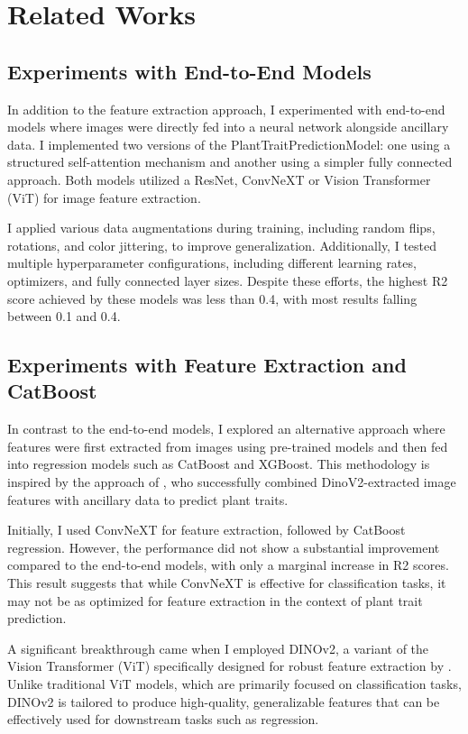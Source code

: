\documentclass{article}
\begin{document}
\section{Related Works}

\subsection{Experiments with End-to-End Models}
In addition to the feature extraction approach, I experimented with end-to-end models where images were directly fed into a neural network alongside ancillary data. I implemented two versions of the PlantTraitPredictionModel: one using a structured self-attention mechanism and another using a simpler fully connected approach. Both models utilized a ResNet, ConvNeXT or Vision Transformer (ViT) for image feature extraction.

I applied various data augmentations during training, including random flips, rotations, and color jittering, to improve generalization. Additionally, I tested multiple hyperparameter configurations, including different learning rates, optimizers, and fully connected layer sizes. Despite these efforts, the highest R2 score achieved by these models was less than 0.4, with most results falling between 0.1 and 0.4.

\subsection{Experiments with Feature Extraction and CatBoost}
In contrast to the end-to-end models, I explored an alternative approach where features were first extracted from images using pre-trained models and then fed into regression models such as CatBoost and XGBoost. This methodology is inspired by the approach of \citet{korotas2024}, who successfully combined DinoV2-extracted image features with ancillary data to predict plant traits.

Initially, I used ConvNeXT for feature extraction, followed by CatBoost regression. However, the performance did not show a substantial improvement compared to the end-to-end models, with only a marginal increase in R2 scores. This result suggests that while ConvNeXT is effective for classification tasks, it may not be as optimized for feature extraction in the context of plant trait prediction.

A significant breakthrough came when I employed DINOv2, a variant of the Vision Transformer (ViT) specifically designed for robust feature extraction by \citet{DINOv2}. Unlike traditional ViT models, which are primarily focused on classification tasks, DINOv2 is tailored to produce high-quality, generalizable features that can be effectively used for downstream tasks such as regression.
\end{document}
